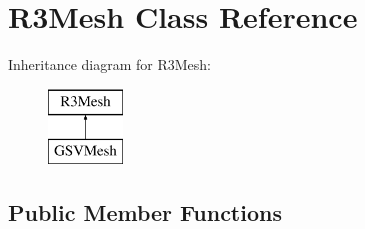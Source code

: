 \hypertarget{class_r3_mesh}{}\section{R3\+Mesh Class Reference}
\label{class_r3_mesh}
Inheritance diagram for R3\+Mesh\+:\begin{figure}[H]
\begin{center}
\leavevmode
\includegraphics[height=2.000000cm]{class_r3_mesh}
\end{center}
\end{figure}
\subsection*{Public Member Functions}
